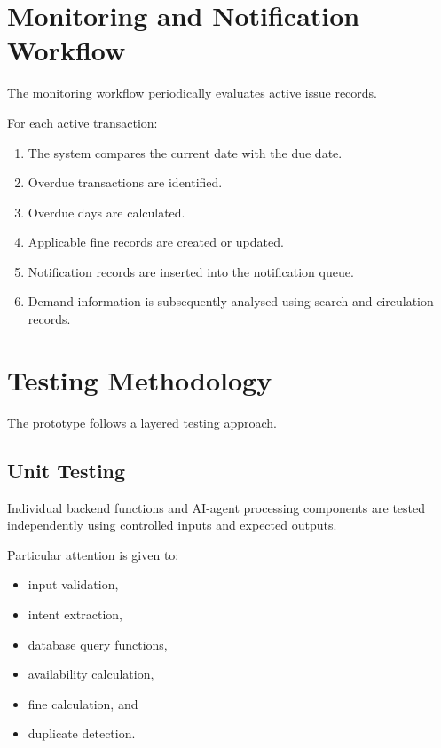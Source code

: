 \documentclass{tietreport}
\begin{document}
\section{Monitoring and Notification Workflow}

The monitoring workflow periodically evaluates active issue records.

For each active transaction:

\begin{enumerate}

    \item The system compares the current date with the due date.

    \item Overdue transactions are identified.

    \item Overdue days are calculated.

    \item Applicable fine records are created or updated.

    \item Notification records are inserted into the notification queue.

    \item Demand information is subsequently analysed using search and
    circulation records.

\end{enumerate}


\section{Testing Methodology}

The prototype follows a layered testing approach.

\subsection{Unit Testing}

Individual backend functions and AI-agent processing components are tested
independently using controlled inputs and expected outputs.

Particular attention is given to:

\begin{itemize}

    \item input validation,

    \item intent extraction,

    \item database query functions,

    \item availability calculation,

    \item fine calculation, and

    \item duplicate detection.

\end{itemize}
\end{document}
